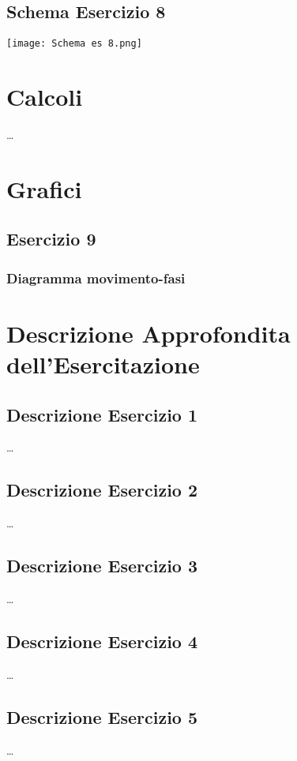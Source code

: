 \documentclass[a4paper]{article}
\begin{document}
\subsection{Schema Esercizio 8}
\begin{center}
\texttt{[image: Schema es 8.png]}
\end{center}
\clearpage

\section{Calcoli}
\dots

\section{Grafici}
\subsection{Esercizio 9}
\subsubsection{Diagramma movimento-fasi}




\section{Descrizione Approfondita dell'Esercitazione}
\subsection{Descrizione Esercizio 1}
\dots

\subsection{Descrizione Esercizio 2}
\dots

\subsection{Descrizione Esercizio 3}
\dots

\subsection{Descrizione Esercizio 4}
\dots

\subsection{Descrizione Esercizio 5}
\dots
\end{document}
